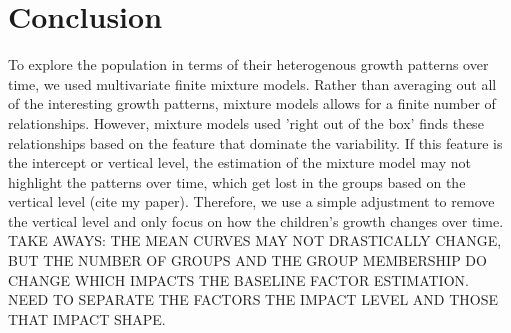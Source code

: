 \documentclass[11pt]{article}
\begin{document}
\section{Conclusion}
To explore the population in terms of their heterogenous growth patterns over time, we used multivariate finite mixture models. Rather than averaging out all of the interesting growth patterns, mixture models allows for a finite number of relationships. However, mixture models used 'right out of the box' finds these relationships based on the feature that dominate the variability. If this feature is the intercept or vertical level, the estimation of the mixture model may not highlight the patterns over time, which get lost in the groups based on the vertical level (cite my paper). Therefore, we use a simple adjustment to remove the vertical level and only focus on how the children's growth changes over time.\\

TAKE AWAYS: THE MEAN CURVES MAY NOT DRASTICALLY CHANGE, BUT THE NUMBER OF GROUPS AND THE GROUP MEMBERSHIP DO CHANGE WHICH IMPACTS THE BASELINE FACTOR ESTIMATION. NEED TO SEPARATE THE FACTORS THE IMPACT LEVEL AND THOSE THAT IMPACT SHAPE. 
\end{document}
